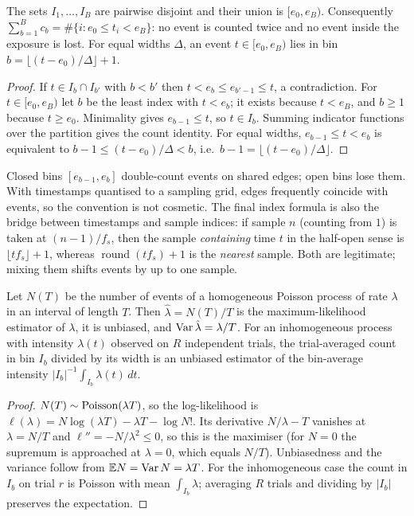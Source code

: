 \begin{theorem}\label{ars:count-001}
The sets $I_1,\dots,I_B$ are pairwise disjoint and their union is $[e_0,e_B)$. Consequently $\sum_{b=1}^B c_b=\#\{i:e_0\le t_i<e_B\}$: no event is counted twice and no event inside the exposure is lost. For equal widths $\Delta$, an event $t\in[e_0,e_B)$ lies in bin $b=\lfloor (t-e_0)/\Delta\rfloor+1$.
\end{theorem}
\begin{proof}
If $t\in I_b\cap I_{b'}$ with $b<b'$ then $t<e_b\le e_{b'-1}\le t$, a contradiction. For $t\in[e_0,e_B)$ let $b$ be the least index with $t<e_b$; it exists because $t<e_B$, and $b\ge1$ because $t\ge e_0$. Minimality gives $e_{b-1}\le t$, so $t\in I_b$. Summing indicator functions over the partition gives the count identity. For equal widths, $e_{b-1}\le t<e_b$ is equivalent to $b-1\le (t-e_0)/\Delta<b$, i.e.\ $b-1=\lfloor (t-e_0)/\Delta\rfloor$.
\end{proof}
\begin{remark}
Closed bins $[e_{b-1},e_b]$ double-count events on shared edges; open bins lose them. With timestamps quantised to a sampling grid, edges frequently coincide with events, so the convention is not cosmetic. The final index formula is also the bridge between timestamps and sample indices: if sample $n$ (counting from $1$) is taken at $(n-1)/f_s$, then the sample \emph{containing} time $t$ in the half-open sense is $\lfloor t f_s\rfloor+1$, whereas $\operatorname{round}(tf_s)+1$ is the \emph{nearest} sample. Both are legitimate; mixing them shifts events by up to one sample.
\end{remark}

\begin{theorem}\label{ars:count-002}
Let $N(T)$ be the number of events of a homogeneous Poisson process of rate $\lambda$ in an interval of length $T$. Then $\hat\lambda=N(T)/T$ is the maximum-likelihood estimator of $\lambda$, it is unbiased, and $\operatorname{Var}\hat\lambda=\lambda/T$. For an inhomogeneous process with intensity $\lambda(t)$ observed on $R$ independent trials, the trial-averaged count in bin $I_b$ divided by its width is an unbiased estimator of the bin-average intensity $|I_b|^{-1}\int_{I_b}\lambda(t)\,dt$.
\end{theorem}
\begin{proof}
$N(T)\sim\operatorname{Poisson}(\lambda T)$, so the log-likelihood is $\ell(\lambda)=N\log(\lambda T)-\lambda T-\log N!$. Its derivative $N/\lambda-T$ vanishes at $\lambda=N/T$ and $\ell''=-N/\lambda^2\le0$, so this is the maximiser (for $N=0$ the supremum is approached at $\lambda=0$, which equals $N/T$). Unbiasedness and the variance follow from $\mathbb E N=\operatorname{Var} N=\lambda T$. For the inhomogeneous case the count in $I_b$ on trial $r$ is Poisson with mean $\int_{I_b}\lambda$; averaging $R$ trials and dividing by $|I_b|$ preserves the expectation.
\end{proof}

